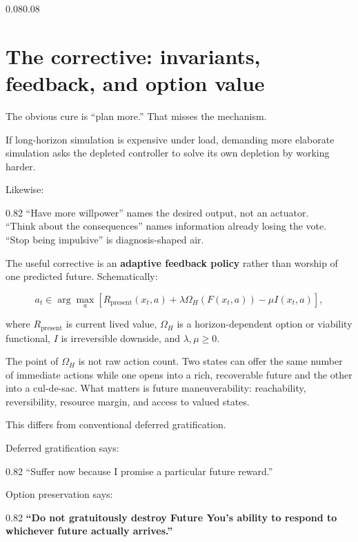 \documentclass[10pt,letterpaper]{article}
\newenvironment{paperbody}
  {\begin{adjustwidth}{0.08\textwidth}{0.08\textwidth}\justifying}
  {\par\end{adjustwidth}}
\newenvironment{voicebox}
  {\Needspace{3.5\baselineskip}\par\vspace{0.22em}\begin{center}\begingroup
   \begin{lrbox}{\voiceboxsave}\begin{varwidth}{0.82\linewidth}
   \small\rmfamily\upshape\RaggedRight}
  {\end{varwidth}\end{lrbox}\fbox{\usebox{\voiceboxsave}}
   \endgroup\end{center}\vspace{0.22em}}
\newenvironment{thesisbox}
  {\Needspace{3.5\baselineskip}\par\vspace{0.32em}\begin{center}\begingroup
   \begin{lrbox}{\thesisboxsave}\begin{varwidth}{0.82\linewidth}
   \normalsize\rmfamily\bfseries\upshape\RaggedRight}
  {\end{varwidth}\end{lrbox}\fbox{\usebox{\thesisboxsave}}
   \endgroup\end{center}\vspace{0.32em}}
\let\oldsection\section
\renewcommand{\section}{\Needspace{6\baselineskip}\oldsection}
\begin{document}
\begin{paperbody}
\section{The corrective: invariants, feedback, and option
value}\label{the-corrective-invariants-feedback-and-option-value}

The obvious cure is ``plan more.'' That misses the mechanism.

If long-horizon simulation is expensive under load, demanding more
elaborate simulation asks the depleted controller to solve its own
depletion by working harder.

Likewise:

\begin{voicebox}
``Have more willpower'' names the desired output, not an actuator.\\
``Think about the consequences'' names information already losing the
vote.\\
``Stop being impulsive'' is diagnosis-shaped air.
\end{voicebox}

The useful corrective is an \textbf{adaptive feedback policy} rather
than worship of one predicted future. Schematically:

\[
a_t\in\arg\max_a
\left[
R_{\mathrm{present}}(x_t,a)
+
\lambda\Omega_H(F(x_t,a))
-
\mu I(x_t,a)
\right],
\]

where \(R_{\mathrm{present}}\) is current lived value, \(\Omega_H\) is a
horizon-dependent option or viability functional, \(I\) is irreversible
downside, and \(\lambda,\mu\ge 0\).

The point of \(\Omega_H\) is not raw action count. Two states can offer
the same number of immediate actions while one opens into a rich,
recoverable future and the other into a cul-de-sac. What matters is
future maneuverability: reachability, reversibility, resource margin,
and access to valued states.

This differs from conventional deferred gratification.

Deferred gratification says:

\begin{voicebox}
``Suffer now because I promise a particular future reward.''
\end{voicebox}

Option preservation says:

\begin{thesisbox}
``Do not gratuitously destroy Future You's ability to respond to
whichever future actually arrives.''
\end{thesisbox}


\end{paperbody}
\end{document}
